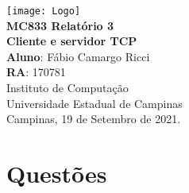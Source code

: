\documentclass[12pt,a4paper]{report}
\begin{document}
\begin{titlepage}
    \begin{center}
        \vspace*{1cm}
        \texttt{[image: Logo]}\\
        \vspace{1.5cm}
        \Huge
    	\textbf{MC833 Relatório 3 \\
        Cliente e servidor TCP} \\
        \vspace{1.5cm}
        \Large
        \textbf{Aluno}: Fábio Camargo Ricci\\
        \textbf{RA}: 170781\\
        \vspace{1.2cm}
    	\Large 
    	Instituto de Computação\\
    	Universidade Estadual de Campinas\\
    	\vspace{1.5cm}
        Campinas, 19 de Setembro de 2021.
    \end{center}
\end{titlepage}
\tableofcontents
\clearpage

\newcommand{\shellcmd}[1]{\texttt{\footnotesize\# #1}}%

\section{Questões}
\end{document}
